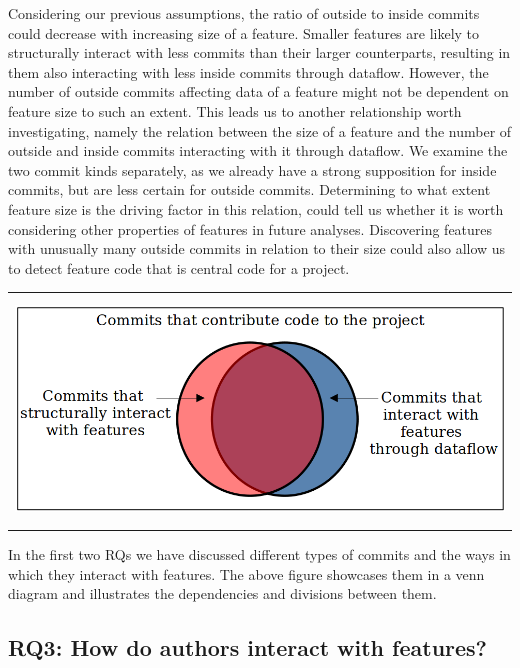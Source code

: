 Considering our previous assumptions, the ratio of outside to inside commits could decrease with increasing size of a feature.
Smaller features are likely to structurally interact with less commits than their larger counterparts, resulting in them also interacting with less inside commits through dataflow.
However, the number of outside commits affecting data of a feature might not be dependent on feature size to such an extent.
This leads us to another relationship worth investigating, namely the relation between the size of a feature and the number of outside and inside commits interacting with it through dataflow.
We examine the two commit kinds separately, as we already have a strong supposition for inside commits, but are less certain for outside commits. 
Determining to what extent feature size is the driving factor in this relation, could tell us whether it is worth considering other  properties of features in future analyses.
Discovering features with unusually many outside commits in relation to their size could also allow us to detect feature code that is central code for a project.

\begin{center}
\begin{tabular}{c}
\includegraphics[height=6cm]{gfx/Commits-of-a-Software-Project.png}
\end{tabular}
\end{center}
In the first two RQs we have discussed different types of commits and the ways in which they interact with features. 
The above figure showcases them in a venn diagram and illustrates the dependencies and divisions between them.

\subsection[RQ3: How do authors interact with features?]{\textbf{RQ3}: How do authors interact with features?}\label{sec:meth:RQ3}


